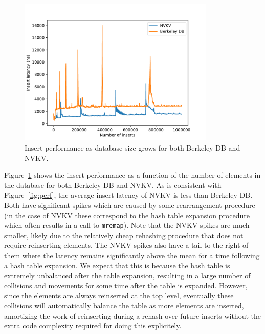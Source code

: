 \begin{figure}
\centering
\hspace*{-0.2in}
\includegraphics[width=94mm]{fig/line}
\caption{Insert performance as database size grows for both Berkeley DB and
NVKV.}
\label{fig:line}
\end{figure}

Figure~\ref{fig:line} shows the insert performance as a function of the number
of elements in the database for both Berkeley DB and NVKV. As is consistent with
Figure~\ref{fig:perf}, the average insert latency of NVKV is less than Berkeley
DB. Both have significant spikes which are caused by some rearrangement
procedure (in the case of NVKV these correspond to the hash table expansion
procedure which often results in a call to \texttt{mremap}).
Note that the NVKV spikes are much smaller, likely due to the
relatively cheap rehashing procedure that does not require reinserting elements.
The NVKV spikes also have a tail to the right of them where the latency remains
significantly above the mean for a time following a hash table expansion. We
expect that this is because the hash table is extremely unbalanced after the
table expansion, resulting in a large number of collisions and movements for
some time after the table is expanded. However, since the elements are always
reinserted at the top level, eventually these collisions will automatically
balance the table as more elements are inserted, amortizing the work of
reinserting during a rehash over future inserts without the extra code
complexity required for doing this explicitely.



